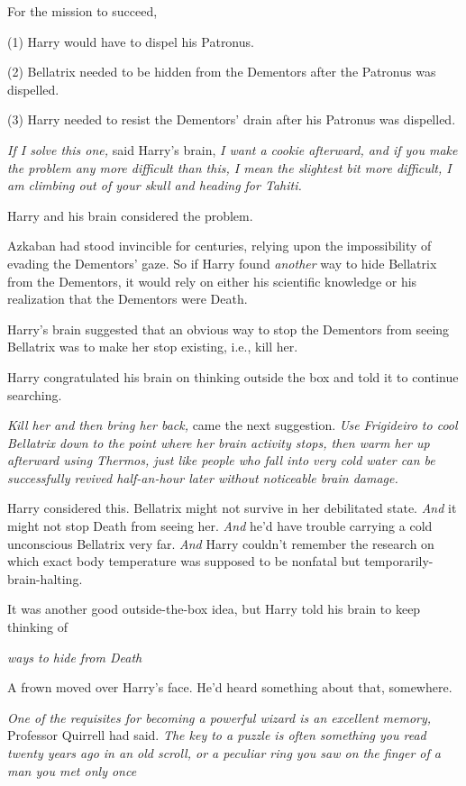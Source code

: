 For the mission to succeed,

(1) Harry would have to dispel his Patronus.

(2) Bellatrix needed to be hidden from the Dementors after the Patronus was
dispelled.

(3) Harry needed to resist the Dementors' drain after his Patronus was
dispelled.

{\el}

\emph{If I solve this one,} said Harry's brain, \emph{I want a cookie
afterward, and if you make the problem any more difficult than this, I mean the
slightest bit more difficult, I am climbing out of your skull and heading for
Tahiti.}

Harry and his brain considered the problem.

Azkaban had stood invincible for centuries, relying upon the impossibility of
evading the Dementors' gaze. So if Harry found \emph{another} way to hide
Bellatrix from the Dementors, it would rely on either his scientific knowledge
or his realization that the Dementors were Death.

Harry's brain suggested that an obvious way to stop the Dementors from seeing
Bellatrix was to make her stop existing, i.e., kill her.

Harry congratulated his brain on thinking outside the box and told it to
continue searching.

\emph{Kill her and then bring her back,} came the next suggestion. \emph{Use
Frigideiro to cool Bellatrix down to the point where her brain activity stops,
then warm her up afterward using Thermos, just like people who fall into very
cold water can be successfully revived half-an-hour later without noticeable
brain damage.}

Harry considered this. Bellatrix might not survive in her debilitated state.
\emph{And} it might not stop Death from seeing her. \emph{And} he'd have
trouble carrying a cold unconscious Bellatrix very far. \emph{And} Harry
couldn't remember the research on which exact body temperature was supposed to
be nonfatal but temporarily-brain-halting.

It was another good outside-the-box idea, but Harry told his brain to keep
thinking of{\el}

\emph{{\el}ways to hide from Death{\el}}

A frown moved over Harry's face. He'd heard something about that, somewhere.

\emph{One of the requisites for becoming a powerful wizard is an excellent
memory,} Professor Quirrell had said. \emph{The key to a puzzle is often
something you read twenty years ago in an old scroll, or a peculiar ring you
saw on the finger of a man you met only once{\el}}

